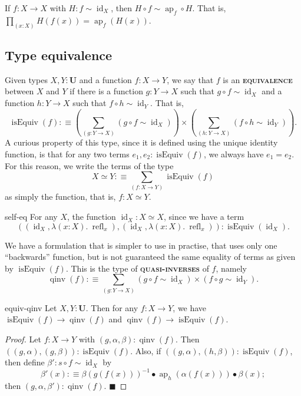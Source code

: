 \documentclass{article}
\newcommand{\defn}[1]{{\scshape\bfseries\color{MPBemph}#1}}
\renewcommand{\qed}{\hfill{\color{MPBthm}\( \blacksquare \)}}
\newcommand{\eql}{\mathbin{:\equiv}}
\newcommand{\U}{\mathbf{U}}
\newcommand{\tpi}[1]{\prod_{(#1)}}
\newcommand{\tsigma}[1]{\sum_{(#1)}}
\newcommand{\1}{\textbf{1}}
\newcommand{\0}{\mathbf{0}}
\newcommand{\2}{\textbf{2}}
\DeclareMathOperator{\refl}{refl}
\DeclareMathOperator{\ap}{ap}
\DeclareMathOperator{\id}{id}
\DeclareMathOperator{\isEquiv}{isEquiv}
\DeclareMathOperator{\qinv}{qinv}
\begin{document}
\begin{corollary}{}{} If \( f : X \to X \) with \( H : f \sim \id_{X} \), then \( H \circ f \sim {\ap_{f}} \circ H \). That is, \( \tpi{x : X} H(f(x)) = \ap_{f}(H(x)) \).
\end{corollary}
\subsection{Type equivalence}
Given types \( X, Y : \U \) and a function \( f : X \to Y \), we say that \( f \) is an \defn{equivalence} between \( X \) and \( Y \) if there is a function \( g : Y \to X \) such that \( g \circ f \sim \id_{X} \) and a function \( h : Y \to X \) such that \( f \circ h \sim \id_{Y} \). That is,
\[ \isEquiv(f) \eql (\tsigma{g : Y \to X} (g \circ f \sim \id_{X})) \times (\tsigma{h : Y \to X} (f \circ h \sim \id_{Y})). \]
A curious property of this type, since it is defined using the unique identity function, is that for any two terms \( e_{1}, e_{2} : \isEquiv(f) \), we always have \( e_{1} = e_{2} \). For this reason, we write the terms of the type
\[ X \simeq Y \eql \tsigma{f : X \to Y} \isEquiv(f) \]
as simply the function, that is, \( f : X \simeq Y \).
\begin{example}{}{self-eq}
	For any \( X \), the function \( \id_{X} : X \simeq X \), since we have a term
	\[ ((\id_{X}, \lambda(x : X).~\refl_{x}), (\id_{X}, \lambda(x : X).~\refl_{x})) : 	\isEquiv(\id_{X}). \]
\end{example}
We have a formulation that is simpler to use in practise, that uses only one ``backwards'' function, but is not guaranteed the same equality of terms as given by \( \isEquiv(f) \). This is the type of \defn{quasi-inverses} of \( f \), namely
\[ \qinv(f) \eql \tsigma{g : Y \to X} (g \circ f \sim \id_{X}) \times (f \circ g \sim \id_{Y}). \]
\begin{lemma}{}{equiv-qinv} Let \( X, Y : \U \). Then for any \( f : X \to Y \), we have \( \isEquiv(f) \to \qinv(f) \) and \( \qinv(f) \to \isEquiv(f) \).
\begin{proof}
	Let \( f : X \to Y \) with \( (g, \alpha, \beta) : \qinv(f) \). Then \( ((g, \alpha), (g, \beta)) : \isEquiv(f) \). Also, if \( ((g, \alpha), (h, \beta)) : \isEquiv(f) \), then define \( \beta' : s \circ f \sim \id_{X} \) by
	\[ \beta'(x) \eql \beta(g(f(x)))^{-1} \bullet \ap_{h}(\alpha(f(x))) \bullet \beta(x); \]
	then \( (g, \alpha, \beta') : \qinv(f) \). \qed
\end{proof} \end{lemma} \noindent
\end{document}
